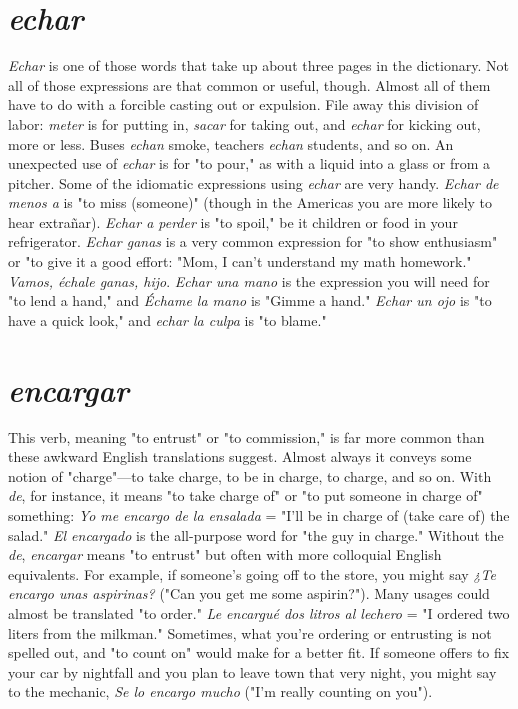 \documentclass[14pt,a4paper,oneside]{memoir}
\begin{document}
\section{\emph{echar}}

\emph{Echar} is one of those words that take up about three pages in
the dictionary. Not all of those expressions are that common or useful,
though. Almost all of them have to do with a forcible casting out or
expulsion. File away this division of labor: \emph{meter} is for putting in, \emph{sacar} for taking out, and \emph{echar} for kicking out, more or less. Buses \emph{echan}
smoke, teachers \emph{echan} students, and so on. An unexpected use of
\emph{echar} is for "to pour," as with a liquid into a glass or from a pitcher.
Some of the idiomatic expressions using \emph{echar} are very handy. \emph{Echar
	de menos a} is "to miss (someone)" (though in the Americas you are
more likely to hear extrañar). \emph{Echar a perder} is "to spoil," be it children or food in your refrigerator. \emph{Echar ganas} is a very common
expression for "to show enthusiasm" or "to give it a good effort: "Mom,
I can't understand my math homework." \emph{Vamos, échale ganas, hijo}.
\emph{Echar una mano} is the expression you will need for "to lend a hand,"
and \emph{Échame la mano} is "Gimme a hand." \emph{Echar un ojo} is "to have a
quick look," and \emph{echar la culpa} is "to blame."

\section{\emph{encargar}}

This verb, meaning "to entrust" or "to commission," is far
more common than these awkward English translations suggest. Almost always it conveys some notion of "charge"---to take charge, to be
in charge, to charge, and so on. With \emph{de}, for instance, it means "to take
charge of" or "to put someone in charge of" something: \emph{Yo me encargo
	de la ensalada} = "I'll be in charge of (take care of) the salad." \emph{El encargado} is the all-purpose word for "the guy in charge." Without the
\emph{de}, \emph{encargar} means "to entrust" but often with more colloquial English equivalents. For example, if someone's going off to the store, you
might say \emph{¿Te encargo unas aspirinas?} ("Can you get me some aspirin?"). Many usages could almost be translated "to order." \emph{Le encargué
	dos litros al lechero} = "I ordered two liters from the milkman." Sometimes, what you're ordering or entrusting is not spelled out, and "to
count on" would make for a better fit. If someone offers to fix your car
by nightfall and you plan to leave town that very night, you might say
to the mechanic, \emph{Se lo encargo mucho} ("I'm really counting on you").
\end{document}
